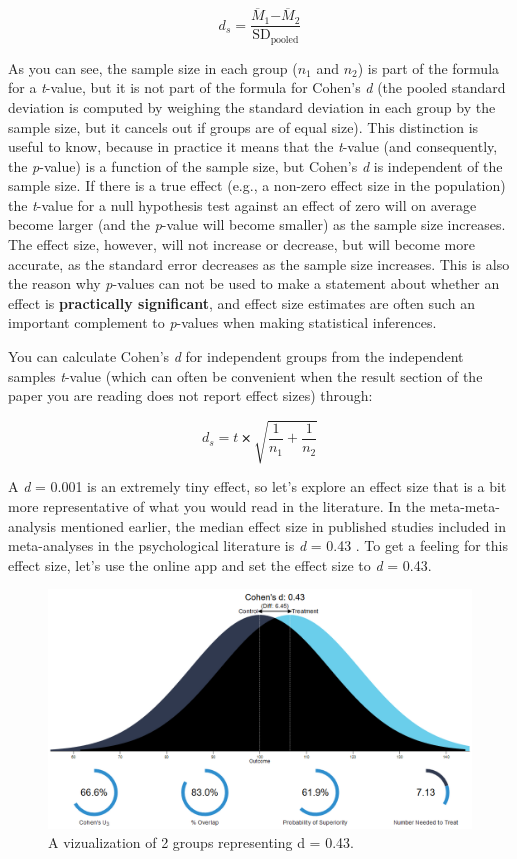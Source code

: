 \documentclass[
  oneside]{book}
\begin{document}
\[d_s = \frac{{\overline{M}}_{1}{-\overline{M}}_{2}}{\text{SD}_{\text{pooled}}}\]

As you can see, the sample size in each group (\(n_1\) and \(n_2\)) is part of the formula for a \emph{t}-value, but it is not part of the formula for Cohen's \emph{d} (the pooled standard deviation is computed by weighing the standard deviation in each group by the sample size, but it cancels out if groups are of equal size). This distinction is useful to know, because in practice it means that the \emph{t}-value (and consequently, the \emph{p}-value) is a function of the sample size, but Cohen's \emph{d} is independent of the sample size. If there is a true effect (e.g., a non-zero effect size in the population) the \emph{t}-value for a null hypothesis test against an effect of zero will on average become larger (and the \emph{p}-value will become smaller) as the sample size increases. The effect size, however, will not increase or decrease, but will become more accurate, as the standard error decreases as the sample size increases. This is also the reason why \emph{p}-values can not be used to make a statement about whether an effect is \textbf{practically significant}, and effect size estimates are often such an important complement to \emph{p}-values when making statistical inferences.

You can calculate Cohen's \emph{d} for independent groups from the independent samples \emph{t}-value (which can often be convenient when the result section of the paper you are reading does not report effect sizes) through:

\[d_s = t ⨯ \sqrt{\frac{1}{n_{1}} + \frac{1}{n_{2}}}\]

A \emph{d} = 0.001 is an extremely tiny effect, so let's explore an effect size that is a bit more representative of what you would read in the literature. In the meta-meta-analysis mentioned earlier, the median effect size in published studies included in meta-analyses in the psychological literature is \emph{d} = 0.43 \citep{richard_one_2003}. To get a feeling for this effect size, let's use the online app and set the effect size to \emph{d} = 0.43.

\begin{figure}

{\centering \includegraphics[width=1\linewidth]{images/rpsychd2} 

}

\caption{A vizualization of 2 groups representing d = 0.43.}\label{fig:rpsychd2}
\end{figure}
\end{document}
